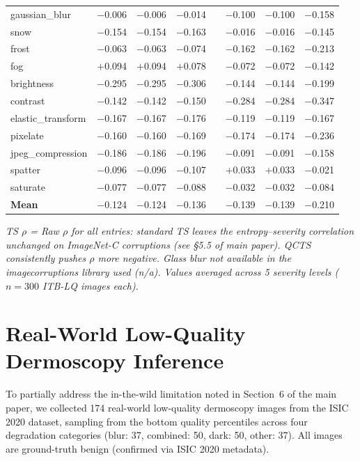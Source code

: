 \documentclass{bmvc2k}
\begin{document}
\begin{longtable}{lccccccc}
gaussian\_blur     & $-$0.006 & $-$0.006 & $-$0.014 & & $-$0.100 & $-$0.100 & $-$0.158 \\
snow               & $-$0.154 & $-$0.154 & $-$0.163 & & $-$0.016 & $-$0.016 & $-$0.145 \\
frost              & $-$0.063 & $-$0.063 & $-$0.074 & & $-$0.162 & $-$0.162 & $-$0.213 \\
fog                & $+$0.094 & $+$0.094 & $+$0.078 & & $-$0.072 & $-$0.072 & $-$0.142 \\
brightness         & $-$0.295 & $-$0.295 & $-$0.306 & & $-$0.144 & $-$0.144 & $-$0.199 \\
contrast           & $-$0.142 & $-$0.142 & $-$0.150 & & $-$0.284 & $-$0.284 & $-$0.347 \\
elastic\_transform & $-$0.167 & $-$0.167 & $-$0.176 & & $-$0.119 & $-$0.119 & $-$0.167 \\
pixelate           & $-$0.160 & $-$0.160 & $-$0.169 & & $-$0.174 & $-$0.174 & $-$0.236 \\
jpeg\_compression  & $-$0.186 & $-$0.186 & $-$0.196 & & $-$0.091 & $-$0.091 & $-$0.158 \\
spatter            & $-$0.096 & $-$0.096 & $-$0.107 & & $+$0.033 & $+$0.033 & $-$0.021 \\
saturate           & $-$0.077 & $-$0.077 & $-$0.088 & & $-$0.032 & $-$0.032 & $-$0.084 \\
\midrule
\textbf{Mean}      & $-$0.124 & $-$0.124 & $-$0.136 & & $-$0.139 & $-$0.139 & $-$0.210 \\
\end{longtable}

\emph{TS $\rho$ = Raw $\rho$ for all entries: standard TS leaves the entropy--severity correlation unchanged on ImageNet-C corruptions (see \S5.5 of main paper). QCTS consistently pushes $\rho$ more negative. Glass blur not available in the imagecorruptions library used (n/a). Values averaged across 5 severity levels ($n{=}300$ ITB-LQ images each).}

\section{Real-World Low-Quality Dermoscopy Inference}
\label{app:real_lq}

To partially address the in-the-wild limitation noted in Section~6 of the main paper, we collected 174 real-world low-quality dermoscopy images from the ISIC 2020 dataset, sampling from the bottom quality percentiles across four degradation categories (blur: 37, combined: 50, dark: 50, other: 37). All images are ground-truth benign (confirmed via ISIC 2020 metadata).
\end{document}
